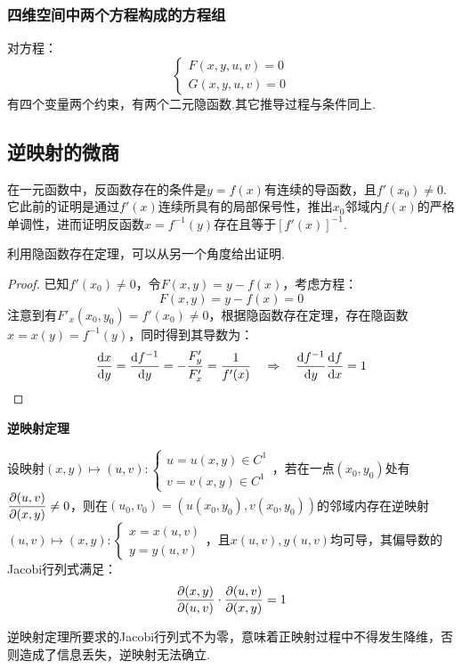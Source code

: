 \subsubsection{四维空间中两个方程构成的方程组}
对方程：
\[\begin{cases}
    F(x,y,u,v) = 0 \\
    G(x,y,u,v) = 0
\end{cases}\]
有四个变量两个约束，有两个二元隐函数.其它推导过程与条件同上.


\subsection{逆映射的微商}
在一元函数中，反函数存在的条件是$y=f(x)$有连续的导函数，且$f'(x_0)\neq 0$.它此前的证明是通过$f'(x)$连续所具有的局部保号性，推出$x_0$邻域内$f(x)$的严格单调性，进而证明反函数$x = f^{-1}(y)$存在且等于$[f'(x)]^{-1}$.

利用隐函数存在定理，可以从另一个角度给出证明.

\begin{proof}
    已知$f'(x_0)\neq 0$，令$F(x,y) = y - f(x)$，考虑方程：
    \[F(x,y) = y - f(x) = 0\]
    注意到有$F'_x(x_0,y_0) = f'(x_0) \neq 0$，根据隐函数存在定理，存在隐函数$x = x(y) = f^{-1}(y)$，同时得到其导数为：
    \[\dv{x}{y} = \dv{f^{-1}}{y} = -\frac{F'_y}{F'_x} = \frac{1}{f'(x)} \quad\Rightarrow\quad \dv{f^{-1}}{y}\dv{f}{x} = 1\]
\end{proof}

\begin{theorem}
    \textbf{逆映射定理}

    设映射$(x,y)\mapsto(u,v):\begin{cases}
        u = u(x,y) \in C^1 \\
        v = v(x,y) \in C^1
    \end{cases}$，若在一点$(x_0,y_0)$处有$\displaystyle\pdv{(u,v)}{(x,y)}\neq 0$，则在$(u_0,v_0) = (u(x_0,y_0),v(x_0,y_0))$的邻域内存在逆映射$(u,v)\mapsto(x,y):\begin{cases}
        x = x(u,v)\\
        y = y(u,v)
    \end{cases}$，且$x(u,v),y(u,v)$均可导，其偏导数的Jacobi行列式满足：
    \[\pdv{(x,y)}{(u,v)}\cdot\pdv{(u,v)}{(x,y)} = 1\]
\end{theorem}

逆映射定理所要求的Jacobi行列式不为零，意味着正映射过程中不得发生降维，否则造成了信息丢失，逆映射无法确立.


